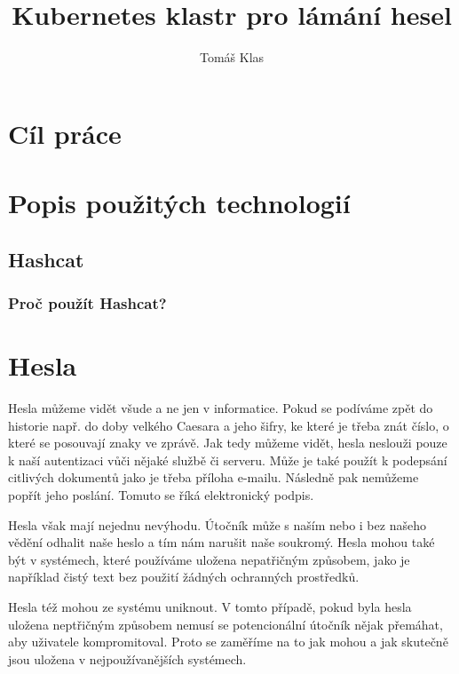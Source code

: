 \documentclass[thesis=B,czech]{FITthesis}[2019/12/23]
\title{Kubernetes klastr pro lámání hesel}
\author{Tomáš Klas} %
\begin{document}

\begin{introduction}
\end{introduction}

\chapter{Cíl práce}

\chapter{Popis použitých technologií}







\section{Hashcat}

\subsection{Proč použít Hashcat?}

\chapter{Hesla}

Hesla můžeme vidět všude a ne jen v informatice. 
Pokud se podíváme zpět do historie např. do doby velkého Caesara a jeho šifry, ke které je třeba znát číslo, o které se posouvají znaky ve zprávě. 
Jak tedy můžeme vidět, hesla neslouži pouze k naší autentizaci vůči nějaké službě či serveru. 
Může je také použít k podepsání citlivých dokumentů jako je třeba příloha e-mailu. 
Následně pak nemůžeme popřít jeho poslání. Tomuto se říká elektronický podpis. 

Hesla však mají nejednu nevýhodu. Útočník může s naším nebo i bez našeho vědění odhalit naše heslo a tím nám narušit naše soukromý. Hesla mohou také být v systémech, které používáme uložena nepatřičným způsobem, jako je například čistý text bez použití žádných ochranných prostředků. 

Hesla též mohou ze systému uniknout. V tomto případě, pokud byla hesla uložena neptřičným způsobem nemusí se potencionální útočník nějak přemáhat, aby uživatele kompromitoval. Proto se zaměříme na to jak mohou a jak skutečně jsou uložena v nejpoužívanějších systémech. 
\end{document}
